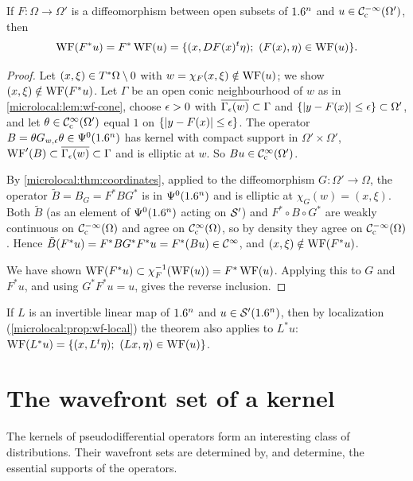 \begin{theorem}\label{microlocal:thm:wf-diffeo}
  If $F:\Omega\to\Omega'$ is a diffeomorphism between open subsets of $1.6^n$
  and $u\in\mathcal{C}^{-\infty}_{\mathrm{c}}(\Omega')$, then
  \begin{equation*}
    \WF(F^*u)=F^*\WF(u)=\{(x,DF(x)^t\eta);\ (F(x),\eta)\in\WF(u)\}.
  \end{equation*}
\end{theorem}
\begin{proof}
  Let $(x,\xi)\in T^*\Omega\setminus0$ with $w=\chi_F(x,\xi)\notin\operatorname{WF}(u)$; we show
  $(x,\xi)\notin\operatorname{WF}(F^*u)$. Let $\Gamma$ be an open conic neighbourhood of $w$
  as in \cref{microlocal:lem:wf-cone}, choose $\epsilon>0$ with
  $\overline{\Gamma_\epsilon(w)}\subset\Gamma$ and $\{\lvert y-F(x)\rvert\le\epsilon\}\subset
  \Omega'$, and let $\theta\in\mathcal{C}^\infty_{\mathrm{c}}(\Omega')$ equal $1$ on
  $\{\lvert y-F(x)\rvert\le\epsilon\}$. The operator
  $B=\theta G_{w,\epsilon}\theta\in\Psi^{0}(1.6^n)$ has kernel with compact support
  in $\Omega'\times\Omega'$, $\operatorname{WF}'(B)\subset\overline{\Gamma_\epsilon(w)}\subset\Gamma$
  and is elliptic at $w$. So $Bu\in\mathcal{C}^\infty_{\mathrm{c}}(\Omega')$.

  By \cref{microlocal:thm:coordinates}, applied to the diffeomorphism
  $G:\Omega'\to\Omega$, the operator $\tilde B=B_G=F^*BG^*$ is in
  $\Psi^{0}(1.6^n)$ and is elliptic at $\chi_G(w)=(x,\xi)$. Both
  $\tilde B$ (as an element of $\Psi^{0}(1.6^n)$ acting on $\mathcal{S}'$) and
  $F^*\circ B\circ G^*$ are weakly continuous on $\mathcal{C}^{-\infty}_{\mathrm{c}}(\Omega)$ and agree on
  $\mathcal{C}^\infty_{\mathrm{c}}(\Omega)$, so by density they agree on $\mathcal{C}^{-\infty}_{\mathrm{c}}(\Omega)$. Hence
  $\tilde B(F^*u)=F^*BG^*F^*u=F^*(Bu)\in\mathcal{C}^\infty$, and $(x,\xi)\notin\operatorname{WF}(F^*u)$.

  We have shown $\operatorname{WF}(F^*u)\subset\chi_F^{-1}(\operatorname{WF}(u))=F^*\operatorname{WF}(u)$. Applying
  this to $G$ and $F^*u$, and using $G^*F^*u=u$, gives the reverse
  inclusion.
\end{proof}

If $L$ is an invertible linear map of $1.6^n$ and $u\in\mathcal{S}'(1.6^n)$, then by
localization (\cref{microlocal:prop:wf-local}) the theorem also applies to
$L^*u$: $\WF(L^*u)=\{(x,L^t\eta);\ (Lx,\eta)\in\WF(u)\}$.

\section{The wavefront set of a kernel}\label{microlocal:sec:kernel}

The kernels of pseudodifferential operators form an interesting class of
distributions. Their wavefront sets are determined by, and determine, the
essential supports of the operators.

